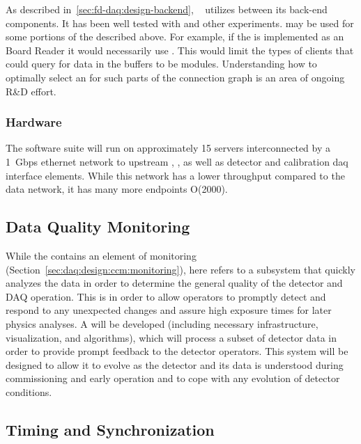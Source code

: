 As described in~\ref{sec:fd-daq:design-backend}, ~\cite{artdaq} utilizes   between its back-end components. 
It has been well tested with  and other experiments. 
 may be used for some portions of the   described above. 
For example, if the  is implemented as an  Board Reader it would necessarily use   . 
This would limit the types of clients that could query for data in the buffers to be  modules. 
Understanding how to optimally select an   for such parts of the  connection graph is an area of ongoing R\&D effort.

\subsubsection{Hardware}
\label{sec:daq:design:ccm:hardware}

The  software suite will run on approximately 15 servers interconnected by a \SI{1}{Gbps} ethernet network to upstream , ,  as well as detector and calibration daq interface elements. While this network has a lower throughput compared to the data network, it has many more endpoints O(2000).

\subsection{Data Quality Monitoring}
\label{sec:fd-daq:design-data-quality}

While the  contains an element of monitoring (Section~\ref{sec:daq:design:ccm:monitoring}), here  refers to a subsystem that quickly analyzes the data in order to determine the general quality of the detector and DAQ operation.
This is in order to allow operators to promptly detect and respond to any unexpected changes and assure high exposure times for later physics analyses. 
A   
will be developed (including necessary infrastructure, visualization,
and algorithms), which will process a subset of detector data in order
to provide prompt feedback to the detector operators. 
This system will be designed to allow it to evolve as the detector and its data is understood during commissioning and early operation and to cope with any evolution of detector conditions.


\subsection{Timing and Synchronization}
\label{sec:sp-daq:design-timing}

